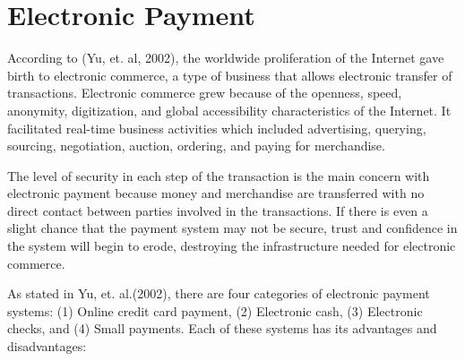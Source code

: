 \section{Electronic Payment}
According to (Yu, et. al, 2002), the worldwide proliferation of the Internet gave birth to electronic commerce, a type of business that allows electronic transfer of transactions. Electronic commerce grew because of the openness, speed, anonymity, digitization, and global accessibility characteristics of the Internet. It facilitated real-time business activities which included advertising, querying, sourcing, negotiation, auction, ordering, and paying for merchandise. 

The level of security in each step of the transaction is the main concern with electronic payment because money and merchandise are transferred with no direct contact between parties involved in the transactions. If there is even a slight chance that the payment system may not be secure, trust and confidence in the system will begin to erode, destroying the infrastructure needed for electronic commerce.

As stated in Yu, et. al.(2002), there are four categories of electronic payment systems: (1) Online credit card payment, (2) Electronic cash, (3) Electronic checks, and (4) Small payments. Each of these systems has its advantages and disadvantages:

